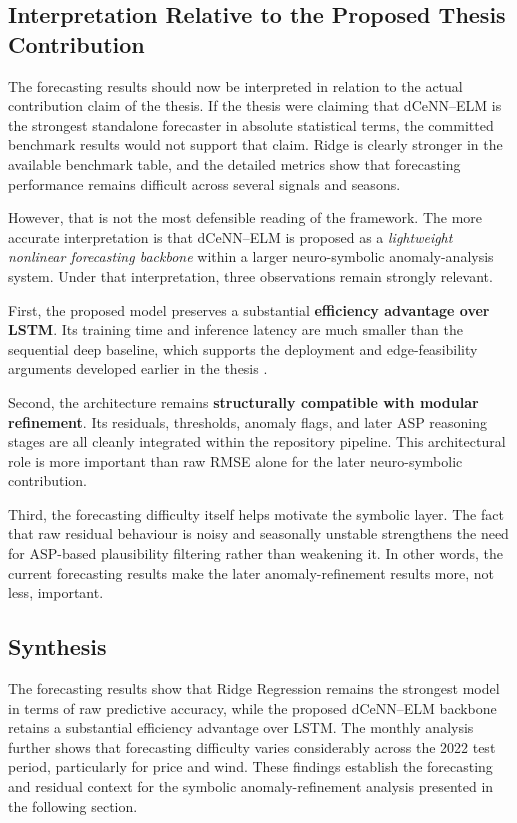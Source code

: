 \subsection{Interpretation Relative to the Proposed Thesis Contribution}

The forecasting results should now be interpreted in relation to the actual contribution claim of the thesis. If the thesis were claiming that dCeNN--ELM is the strongest standalone forecaster in absolute statistical terms, the committed benchmark results would not support that claim. Ridge is clearly stronger in the available benchmark table, and the detailed metrics show that forecasting performance remains difficult across several signals and seasons.

However, that is not the most defensible reading of the framework. The more accurate interpretation is that dCeNN--ELM is proposed as a \emph{lightweight nonlinear forecasting backbone} within a larger neuro-symbolic anomaly-analysis system. Under that interpretation, three observations remain strongly relevant.

First, the proposed model preserves a substantial \textbf{efficiency advantage over LSTM}. Its training time and inference latency are much smaller than the sequential deep baseline, which supports the deployment and edge-feasibility arguments developed earlier in the thesis \cite{repo_thesis_grid_anomaly}.

Second, the architecture remains \textbf{structurally compatible with modular refinement}. Its residuals, thresholds, anomaly flags, and later ASP reasoning stages are all cleanly integrated within the repository pipeline. This architectural role is more important than raw RMSE alone for the later neuro-symbolic contribution.

Third, the forecasting difficulty itself helps motivate the symbolic layer. The fact that raw residual behaviour is noisy and seasonally unstable strengthens the need for ASP-based plausibility filtering rather than weakening it. In other words, the current forecasting results make the later anomaly-refinement results more, not less, important.

\subsection{Synthesis}

The forecasting results show that Ridge Regression remains the strongest model in
terms of raw predictive accuracy, while the proposed dCeNN--ELM backbone retains
a substantial efficiency advantage over LSTM. The monthly analysis further shows
that forecasting difficulty varies considerably across the 2022 test period,
particularly for price and wind. These findings establish the forecasting and
residual context for the symbolic anomaly-refinement analysis presented in the
following section.


